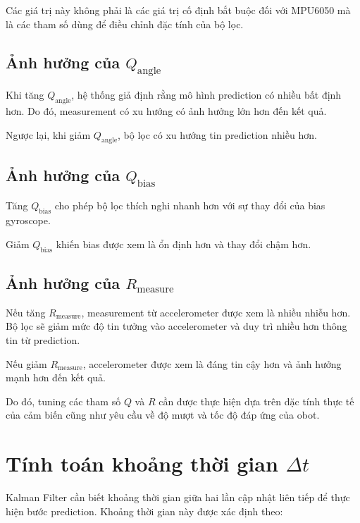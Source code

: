 \documentclass[a4paper,12pt]{report}
\begin{document}
Các giá trị này không phải là các giá trị cố định bắt buộc đối với MPU6050 mà là các tham số dùng để điều chỉnh đặc tính của bộ lọc.

\subsection{Ảnh hưởng của $Q_{\text{angle}}$}

Khi tăng $Q_{\text{angle}}$, hệ thống giả định rằng mô hình prediction có nhiều bất định hơn. Do đó, measurement có xu hướng có ảnh hưởng lớn hơn đến kết quả.

Ngược lại, khi giảm $Q_{\text{angle}}$, bộ lọc có xu hướng tin prediction nhiều hơn.

\subsection{Ảnh hưởng của $Q_{\text{bias}}$}

Tăng $Q_{\text{bias}}$ cho phép bộ lọc thích nghi nhanh hơn với sự thay đổi của bias gyroscope.

Giảm $Q_{\text{bias}}$ khiến bias được xem là ổn định hơn và thay đổi chậm hơn.

\subsection{Ảnh hưởng của $R_{\text{measure}}$}

Nếu tăng $R_{\text{measure}}$, measurement từ accelerometer được xem là nhiều nhiễu hơn. Bộ lọc sẽ giảm mức độ tin tưởng vào accelerometer và duy trì nhiều hơn thông tin từ prediction.

Nếu giảm $R_{\text{measure}}$, accelerometer được xem là đáng tin cậy hơn và ảnh hưởng mạnh hơn đến kết quả.

Do đó, tuning các tham số $Q$ và $R$ cần được thực hiện dựa trên đặc tính thực tế của cảm biến cũng như yêu cầu về độ mượt và tốc độ đáp ứng của  obot.


\section{Tính toán khoảng thời gian $\Delta t$}
\label{sec:dt}

Kalman Filter cần biết khoảng thời gian giữa hai lần cập nhật liên tiếp để thực hiện bước prediction. Khoảng thời gian này được xác định theo:
\end{document}
